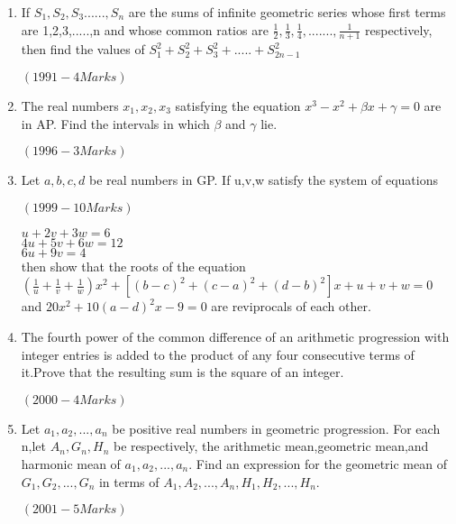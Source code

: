 \documentclass[journal,12pt,twocolumn]{IEEEtran}
\theoremstyle{remark}
\begin{document}
\begin{enumerate}
      \item  If $ S_1,S_2,S_3......,S_n $ are the sums of infinite geometric series whose first terms are 1,2,3,.....,n and whose common ratios are $ \frac{1}{2},\frac{1}{3},\frac{1}{4},.......,\frac{1}{n+1} $ respectively, then find the values of $ S_1^2+S_2^2+S_3^2+.....+S_{2n-1}^2 $
      \begin{flushright}
      $(1991 -4 Marks)$
      \end{flushright} 

		\item  The real numbers $ x_1,x_2,x_3 $ satisfying the equation $ x^3-x^2+\beta x+\gamma=0 $ are in AP. Find the intervals in which $ \beta $ and $\gamma$ lie.
       \begin{flushright}
      $(1996 -3 Marks)$
      \end{flushright}

      \item  Let $ a,b,c,d $ be real numbers in GP. If u,v,w satisfy the system of equations  
    \begin{flushright}
      $(1999 -10 Marks)$
      \end{flushright}
      $    u+2v+3w=6 $ \\
      $    4u+5v+6w=12 $ \\
      $    6u+9v=4 $ \\
      then show that the roots of the equation \\
      $(\frac{1}{u}+\frac{1}{v}+\frac{1}{w})x^2+[(b-c)^2+(c-a)^2+(d-b)^2]x+u+v+w=0 $ and $ 20x^2+10(a-d)^2x-9=0 $ are reviprocals of each other.

      \item The fourth power of the common difference of an arithmetic progression with integer entries is added to the product of any four consecutive terms of it.Prove that the resulting sum is the square of an integer.
      \begin{flushright}
      $(2000 -4 Marks)$
      \end{flushright}

      \item Let $ a_1,a_2,...,a_n $ be positive real numbers in geometric progression. For each n,let $ A_n,G_n,H_n $ be respectively, the arithmetic mean,geometric mean,and harmonic mean of $ a_1,a_2,...,a_n.$ Find an expression for the geometric mean of $ G_1,G_2,...,G_n $ in terms of $ A_1,A_2,...,A_n,H_1,H_2,...,H_n.$ 
	      \begin{flushright}                             $(2001 -5 Marks)$                              \end{flushright}
       

\end{enumerate}
\end{document}

